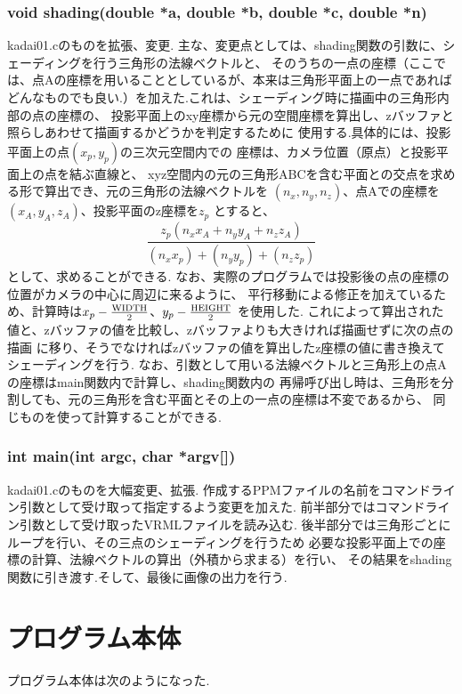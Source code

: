 \documentclass[a4j,dvipdfmx]{jsarticle}
\begin{document}
\subsubsection{void shading(double *a, double *b, double *c, double *n)}
kadai01.cのものを拡張、変更.
主な、変更点としては、shading関数の引数に、シェーディングを行う三角形の法線ベクトルと、
そのうちの一点の座標（ここでは、点Aの座標を用いることとしているが、本来は三角形平面上の一点であれば
  どんなものでも良い.）を加えた.これは、シェーディング時に描画中の三角形内部の点の座標の、
投影平面上のxy座標から元の空間座標を算出し、zバッファと照らしあわせて描画するかどうかを判定するために
使用する.具体的には、投影平面上の点$(x_{p}, y_{p})$の三次元空間内での
座標は、カメラ位置（原点）と投影平面上の点を結ぶ直線と、
xyz空間内の元の三角形ABCを含む平面との交点を求める形で算出でき、元の三角形の法線ベクトルを
$(n_{x}, n_{y}, n_{z})$、点Aでの座標を$(x_{A}, y_{A}, z_{A})$、投影平面のz座標を$z_{p}$
とすると、
\begin{equation}
  \frac{z_{p}(n_{x}x_{A}+n_{y}y_{A}+n_{z}z_{A})}
       {(n_{x}x_{p}) + (n_{y}y_{p}) + (n_{z}z_{p})}
\end{equation}
として、求めることができる.
なお、実際のプログラムでは投影後の点の座標の位置がカメラの中心に周辺に来るように、
平行移動による修正を加えているため、計算時は$x_{p} - \frac{{\rm WIDTH}}{2}$、$y_{p} - \frac{{\rm HEIGHT}}{2}$
を使用した.
これによって算出された値と、zバッファの値を比較し、zバッファよりも大きければ描画せずに次の点の描画
に移り、そうでなければzバッファの値を算出したz座標の値に書き換えてシェーディングを行う.
なお、引数として用いる法線ベクトルと三角形上の点Aの座標はmain関数内で計算し、shading関数内の
再帰呼び出し時は、三角形を分割しても、元の三角形を含む平面とその上の一点の座標は不変であるから、
同じものを使って計算することができる.

\subsubsection{int main(int argc, char *argv[])}
kadai01.cのものを大幅変更、拡張.
作成するPPMファイルの名前をコマンドライン引数として受け取って指定するよう変更を加えた.
前半部分ではコマンドライン引数として受け取ったVRMLファイルを読み込む.
後半部分では三角形ごとにループを行い、その三点のシェーディングを行うため
必要な投影平面上での座標の計算、法線ベクトルの算出（外積から求まる）を行い、
その結果をshading関数に引き渡す.そして、最後に画像の出力を行う.

\section{プログラム本体}
プログラム本体は次のようになった.

\end{document}
